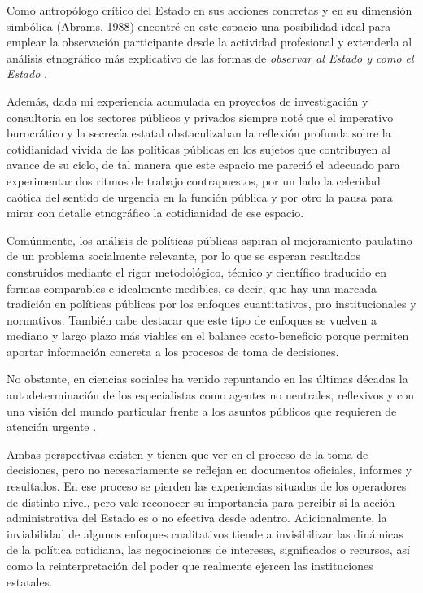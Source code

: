 \documentclass[
  spanish,
  11pt,
  a4paper,
]{scrbook}
\begin{document}
Como antropólogo crítico del Estado en sus acciones concretas y en su
dimensión simbólica (Abrams, 1988) encontré en este espacio una
posibilidad ideal para emplear la observación participante desde la
actividad profesional y extenderla al análisis etnográfico más
explicativo de las formas de \emph{observar al Estado y como el Estado}
\autocite{Scott1998}.

Además, dada mi experiencia acumulada en proyectos de investigación y
consultoría en los sectores públicos y privados siempre noté que el
imperativo burocrático y la secrecía estatal obstaculizaban la reflexión
profunda sobre la cotidianidad vivida de las políticas públicas en los
sujetos que contribuyen al avance de su ciclo, de tal manera que este
espacio me pareció el adecuado para experimentar dos ritmos de trabajo
contrapuestos, por un lado la celeridad caótica del sentido de urgencia
en la función pública y por otro la pausa para mirar con detalle
etnográfico la cotidianidad de ese espacio.

Comúnmente, los análisis de políticas públicas aspiran al mejoramiento
paulatino de un problema socialmente relevante, por lo que se esperan
resultados construidos mediante el rigor metodológico, técnico y
científico traducido en formas comparables e idealmente medibles, es
decir, que hay una marcada tradición en políticas públicas por los
enfoques cuantitativos, pro institucionales y normativos. También cabe
destacar que este tipo de enfoques se vuelven a mediano y largo plazo
más viables en el balance costo-beneficio porque permiten aportar
información concreta a los procesos de toma de decisiones.

No obstante, en ciencias sociales ha venido repuntando en las últimas
décadas la autodeterminación de los especialistas como agentes no
neutrales, reflexivos y con una visión del mundo particular frente a los
asuntos públicos que requieren de atención urgente
\autocite{Lin2015,Soedirgo2020,Guber2001}.

Ambas perspectivas existen y tienen que ver en el proceso de la toma de
decisiones, pero no necesariamente se reflejan en documentos oficiales,
informes y resultados. En ese proceso se pierden las experiencias
situadas de los operadores de distinto nivel, pero vale reconocer su
importancia para percibir si la acción administrativa del Estado es o no
efectiva desde adentro. Adicionalmente, la inviabilidad de algunos
enfoques cualitativos tiende a invisibilizar las dinámicas de la
política cotidiana, las negociaciones de intereses, significados o
recursos, así como la reinterpretación del poder que realmente ejercen
las instituciones estatales.
\end{document}
